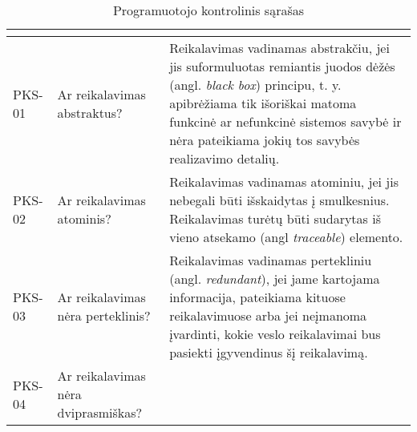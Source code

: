 \documentclass{VUMIFPSkursinis}
\begin{document}
\begin{center}
	\small
	\begin{longtable}{|C{2cm}|L{5cm}|L{8cm}|}
		\caption{Programuotojo kontrolinis sąrašas}
		\label{table:PKS-1}
		\\ \hline
		                               &
		                   &
		\\ \hline
		PKS-01                                                                        &
		Ar reikalavimas abstraktus?                                                   &
		Reikalavimas vadinamas abstrakčiu, jei jis suformuluotas remiantis juodos dėžės (angl. \textit{black box}) principu, t. y. apibrėžiama tik išoriškai matoma funkcinė ar nefunkcinė sistemos savybė ir nėra pateikiama jokių tos savybės realizavimo detalių.                                                                                                                                                                                  \\ \hline
		PKS-02                                                                        &
		Ar reikalavimas atominis?                                                     &
		Reikalavimas vadinamas atominiu, jei jis nebegali būti išskaidytas į smulkesnius. Reikalavimas turėtų būti sudarytas iš vieno atsekamo (angl \textit{traceable}) elemento.                                                                                                                                                                                                                                                                    \\ \hline
		PKS-03                                                                        &
		Ar reikalavimas nėra perteklinis?                                             &
		Reikalavimas vadinamas pertekliniu (angl. \textit{redundant}), jei jame kartojama informacija, pateikiama kituose reikalavimuose arba jei neįmanoma įvardinti, kokie veslo reikalavimai bus pasiekti įgyvendinus šį reikalavimą.                                                                                                                                                                                                              \\ \hline
		PKS-04                                                                        &
		Ar reikalavimas nėra dviprasmiškas?                                           &

\end{longtable}
\end{center}
\end{document}
